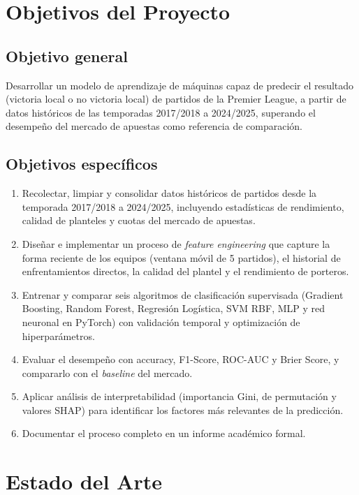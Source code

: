 \documentclass{ieeeaccess}
\begin{document}
\section{Objetivos del Proyecto}
\label{sec:objetivos}

\subsection{Objetivo general}
Desarrollar un modelo de aprendizaje de máquinas capaz de predecir el resultado (victoria local o no victoria local) de partidos de la Premier League, a partir de datos históricos de las temporadas 2017/2018 a 2024/2025, superando el desempeño del mercado de apuestas como referencia de comparación.

\subsection{Objetivos específicos}
\begin{enumerate}
\item Recolectar, limpiar y consolidar datos históricos de partidos desde la temporada 2017/2018 a 2024/2025, incluyendo estadísticas de rendimiento, calidad de planteles y cuotas del mercado de apuestas.
\item Diseñar e implementar un proceso de \textit{feature engineering} que capture la forma reciente de los equipos (ventana móvil de 5 partidos), el historial de enfrentamientos directos, la calidad del plantel y el rendimiento de porteros.
\item Entrenar y comparar seis algoritmos de clasificación supervisada (Gradient Boosting, Random Forest, Regresión Logística, SVM RBF, MLP y red neuronal en PyTorch) con validación temporal y optimización de hiperparámetros.
\item Evaluar el desempeño con accuracy, F1-Score, ROC-AUC y Brier Score, y compararlo con el \textit{baseline} del mercado.
\item Aplicar análisis de interpretabilidad (importancia Gini, de permutación y valores SHAP) para identificar los factores más relevantes de la predicción.
\item Documentar el proceso completo en un informe académico formal.
\end{enumerate}

\section{Estado del Arte}
\label{sec:estado}
\end{document}
